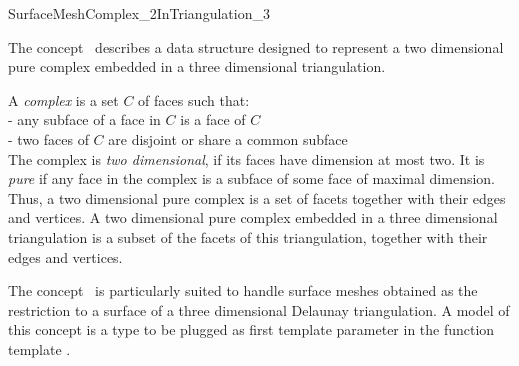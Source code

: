 

\begin{ccRefConcept}{SurfaceMeshComplex_2InTriangulation_3}


\ccDefinition
  
The concept \ccRefName\ describes a data structure
designed  to represent a  two dimensional pure complex 
embedded in a three dimensional triangulation.

A {\em complex} is a set $C$ of faces such that:\\
- any subface of a face in $C$ is a face of $C$ \\
- two faces of $C$ are disjoint or share a common subface \\
The complex is {\em two dimensional}, if its faces have dimension at most
two. It is {\em pure} if any face in the complex is a subface
of some face of maximal dimension.
Thus, a two dimensional pure complex is a set of facets
together with their edges and vertices.
A  two dimensional pure complex  embedded 
in a three dimensional triangulation
is a subset of the  facets 
of this triangulation, together with their edges and vertices.



The concept \ccRefName\  is particularly suited to handle
surface meshes obtained as the restriction to a surface of 
a  three dimensional Delaunay triangulation.
A model of this concept is a type to be plugged as first template
parameter in the 
function template .

%


\end{ccRefConcept}
